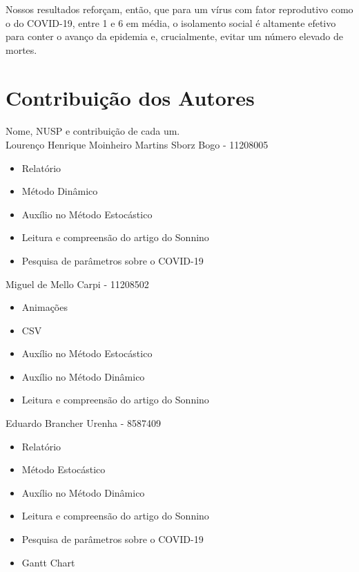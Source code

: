\documentclass[11pt]{article}
\begin{document}
Nossos resultados reforçam, então, que para um vírus com fator reprodutivo como o do COVID-19, entre 1 e 6 em média, o isolamento social é altamente efetivo para conter o avanço da epidemia e, crucialmente, evitar um número elevado de mortes.
\newpage
\section{Contribuição dos Autores}
\label{sec:org17e6ed7}
\paragraph{} Nome, NUSP e contribuição de cada um.\\

Lourenço Henrique Moinheiro Martins Sborz Bogo - 11208005
\begin{itemize}
\item Relatório
\item Método Dinâmico
\item Auxílio no Método Estocástico
\item Leitura e compreensão do artigo do Sonnino
\item Pesquisa de parâmetros sobre o COVID-19\\
\end{itemize}

Miguel de Mello Carpi - 11208502
\begin{itemize}
\item Animações
\item CSV
\item Auxílio no Método Estocástico
\item Auxílio no Método Dinâmico
\item Leitura e compreensão do artigo do Sonnino\\
\end{itemize}

Eduardo Brancher Urenha - 8587409
\begin{itemize}
\item Relatório
\item Método Estocástico
\item Auxílio no Método Dinâmico
\item Leitura e compreensão do artigo do Sonnino
\item Pesquisa de parâmetros sobre o COVID-19
\item Gantt Chart
\end{itemize}
\end{document}
